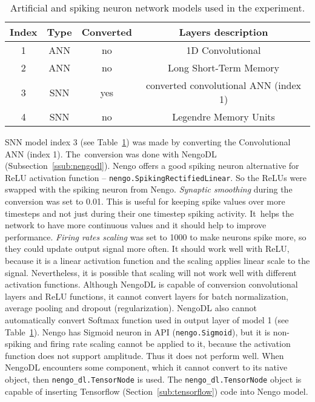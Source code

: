 \begin{table}[ht!]
	\centering
	\begin{tabular}{c c c c}
		\hline
		Index & Type & Converted & Layers description \\
		\hline
		1 & ANN & no & 1D Convolutional \\
		2 & ANN & no & Long Short-Term Memory \\
		3 & SNN & yes & converted convolutional ANN (index 1) \\
		4 & SNN & no & Legendre Memory Units \\
		\hline
	\end{tabular}
	\caption{Artificial and spiking neuron network models used in the experiment.}
	\label{tab:models}
\end{table}

SNN model index 3 (see Table~\ref{tab:models}) was made by converting the Convolutional ANN (index 1). The~conversion was done with NengoDL (Subsection~\ref{ssub:nengodl}). Nengo offers a good spiking neuron alternative for ReLU activation function -- \texttt{nengo.SpikingRectifiedLinear}. So the ReLUs were swapped with the spiking neuron from Nengo. \textit{Synaptic smoothing} during the conversion was set to 0.01. This is useful for keeping spike values over more timesteps and not just during their one timestep spiking activity. It~helps the network to have more continuous values and it should help to improve performance. \textit{Firing rates scaling} was set to 1000 to make neurons spike more, so they could update output signal more often. It should work well with ReLU, because it is a linear activation function and the scaling applies linear scale to the signal. Nevertheless, it is possible that scaling will not work well with different activation functions. Although NengoDL is capable of conversion convolutional layers and ReLU functions, it cannot convert layers for batch normalization, average pooling and dropout (regularization). NengoDL also cannot automatically convert Softmax function used in output layer of model 1 (see Table~\ref{tab:models}). Nengo has Sigmoid neuron in API (\texttt{nengo.Sigmoid}), but it is non-spiking and firing rate scaling cannot be applied to it, because the activation function does not support amplitude. Thus it does not perform well. When NengoDL encounters some component, which it cannot convert to its native object, then \texttt{nengo\_dl.TensorNode} is used. The \texttt{nengo\_dl.TensorNode} object is capable of inserting Tensorflow (Section~\ref{sub:tensorflow}) code into Nengo model.

